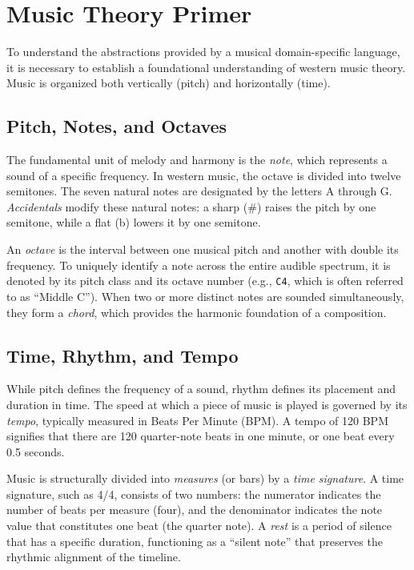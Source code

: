 
\section{Music Theory Primer}\label{detail-sec:background-music-theory}

To understand the abstractions provided by a musical domain-specific language, it is necessary to establish a
foundational understanding of western music theory.
Music is organized both vertically (pitch) and horizontally (time).

\subsection{Pitch, Notes, and Octaves}\label{detail-subsec:pitch-notes-and-octaves}

The fundamental unit of melody and harmony is the \textit{note}, which represents a sound of a specific frequency.
In western music, the octave is divided into twelve semitones.
The seven natural notes are designated by the letters A through G\@.
\textit{Accidentals} modify these natural notes: a sharp (\#) raises the pitch by one semitone, while a flat (b) lowers
it by one semitone.

An \textit{octave} is the interval between one musical pitch and another with double its frequency.
To uniquely identify a note across the entire audible spectrum, it is denoted by its pitch class and its octave number
(e.g., \texttt{C4}, which is often referred to as ``Middle C'').
When two or more distinct notes are sounded simultaneously, they form a \textit{chord}, which provides the harmonic
foundation of a composition.

\subsection{Time, Rhythm, and Tempo}\label{detail-subsec:time-rhythm-and-tempo}

While pitch defines the frequency of a sound, rhythm defines its placement and duration in time.
The speed at which a piece of music is played is governed by its \textit{tempo}, typically measured in Beats Per Minute
(BPM).
A tempo of 120 BPM signifies that there are 120 quarter-note beats in one minute, or one beat every 0.5 seconds.

Music is structurally divided into \textit{measures} (or bars) by a \textit{time signature}.
A time signature, such as 4/4, consists of two numbers: the numerator indicates the number of beats per measure (four),
and the denominator indicates the note value that constitutes one beat (the quarter note).
A \textit{rest} is a period of silence that has a specific duration, functioning as a ``silent note'' that preserves the
rhythmic alignment of the timeline.


